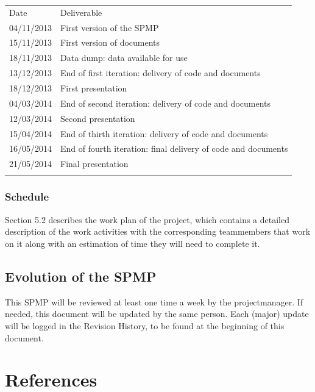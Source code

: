 \documentclass[12pt]{article}
\begin{document}
\begin{longtable}[c]{@{}ll@{}}
\hline\noalign{\medskip}
Date & Deliverable
\\\noalign{\medskip}
\hline\noalign{\medskip}
04/11/2013 & First version of the SPMP
\\\noalign{\medskip}
15/11/2013 & First version of documents
\\\noalign{\medskip}
18/11/2013 & Data dump: data available for use
\\\noalign{\medskip}
13/12/2013 & End of first iteration: delivery of code and documents
\\\noalign{\medskip}
18/12/2013 & First presentation
\\\noalign{\medskip}
04/03/2014 & End of second iteration: delivery of code and documents
\\\noalign{\medskip}
12/03/2014 & Second presentation
\\\noalign{\medskip}
15/04/2014 & End of thirth iteration: delivery of code and documents
\\\noalign{\medskip}
16/05/2014 & End of fourth iteration: final delivery of code and
documents
\\\noalign{\medskip}
21/05/2014 & Final presentation
\\\noalign{\medskip}
\hline
\end{longtable}

\subsubsection{Schedule}\label{schedule}

Section 5.2 describes the work plan of the project, which contains a
detailed description of the work activities with the corresponding
teammembers that work on it along with an estimation of time they will
need to complete it.

\subsection{Evolution of the SPMP}\label{evolution-of-the-spmp}

This SPMP will be reviewed at least one time a week by the
projectmanager. If needed, this document will be updated by the same
person. Each (major) update will be logged in the
Revision History, to be found at the
beginning of this document.

\section{References}\label{references}
\end{document}
